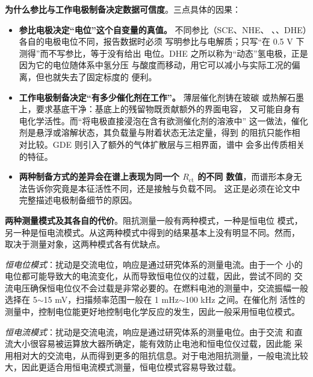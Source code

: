 \begin{pitfall}
\textbf{为什么参比与工作电极制备决定数据可信度}。三点具体的因果：

\begin{itemize}
  \item \textbf{参比电极决定“电位”这个自变量的真值。} 不同参比（SCE、NHE、
        、、DHE）各自的电极电位不同，报告数据时必须
        写明参比与电解质；只写“在 0.5 V 下测得”而不写参比，等于没有给出
        电位。DHE 之所以称为“动态”氢电极，正是因为它的电位随体系中氢分压
        与酸度而移动，用它可以减小与实际工况的偏离，但也就失去了固定标度的
        便利。
  \item \textbf{工作电极制备决定“有多少催化剂在工作”。} 薄层催化剂铸在玻碳
        或热解石墨上，要求基底干净：基底上的残留物既贡献额外的界面电容，
        又可能自身有电化学活性。而“将电极直接浸泡在含有欲测催化剂的溶液中”
        这一做法，催化剂是悬浮或溶解状态，其负载量与附着状态无法定量，得到
        的阻抗只能作相对比较。GDE 则引入了额外的气体扩散层与三相界面，谱中
        会多出传质相关的特征。
  \item \textbf{两种制备方式的差异会在谱上表现为同一个 $R_\mathrm{ct}$ 的不同
        数值}，而谱形本身无法告诉你究竟是本征活性不同，还是接触与负载不同。
        这正是必须在论文中完整描述电极制备细节的原因。
\end{itemize}
\end{pitfall}

\begin{measure}
\textbf{两种测量模式及其各自的代价}。阻抗测量一般有两种模式，一种是恒电位
模式，另一种是恒电流模式。从这两种模式中得到的结果基本上没有明显不同。然而，
取决于测量对象，这两种模式各有优缺点。

\emph{恒电位模式}：扰动是交流电位，响应是通过研究体系的测量电流。由于一个
小的电位都可能导致大的电流变化，从而导致恒电位仪的过载，因此，尝试不同的
交流电压确保恒电位仪不会过载是非常必要的。在燃料电池的测量中，交流振幅一般
选择在 5$\sim$15 mV，扫描频率范围一般在 1 mHz$\sim$100 kHz 之间。在催化剂
活性的测量中，控制电位能更好地控制电化学反应的发生，因此一般采用恒电位模式。

\emph{恒电流模式}：扰动是交流电流，响应是通过研究体系的测量电位。由于交流
和直流大小很容易被运算放大器所确定，能有效防止电池和恒电位仪过载，因此能
采用相对大的交流电，从而得到更多的阻抗信息。对于电池阻抗测量，一般电流比较
大，因此更适合用恒电流模式测量，恒电位模式容易导致过载。
\end{measure}

